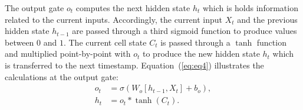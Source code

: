 The output gate \(o_{t}\) computes the next hidden state \(h_{t}\) which is
holds information related to the current inputs. 
Accordingly, the current input \(X_{t}\) and the previous hidden state \(h_{t-1}\) are passed through a third sigmoid function to produce values between \(0\) and \(1\).
The current cell state \(C_{t}\) is passed through a \(\tanh\) function and multiplied point-by-point with \(o_{t}\) to produce the new hidden state \(h_{t}\) which is transferred to the next timestamp.
Equation~(\ref{eq:eq4}) illustrates the calculations at the output gate:
\begin{equation}
	\begin{aligned}
		o_{t} &=\sigma\left(W_{o}\left[h_{t-1}, X_{t}\right]+b_{o}\right),\\
		h_{t} &=o_{t} * \tanh \left(C_{t}\right).
	\end{aligned}
	\label{eq:eq4}
\end{equation} 

